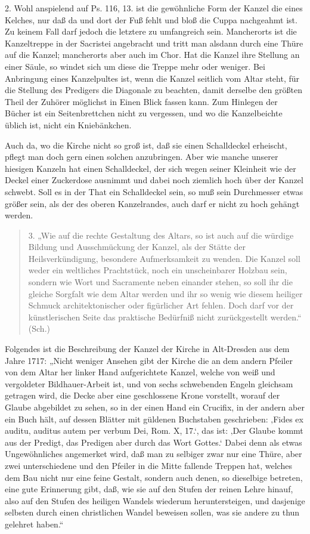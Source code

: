 2. Wohl anspielend auf Ps. 116, 13. ist die gewöhnliche Form der Kanzel die eines Kelches, nur daß da und dort der Fuß fehlt und bloß die Cuppa nachgeahmt ist. Zu keinem Fall darf jedoch die letztere zu umfangreich sein. Mancherorts ist die Kanzeltreppe in der Sacristei angebracht und tritt man alsdann durch eine Thüre auf die Kanzel; mancherorts aber auch im Chor. Hat die Kanzel ihre Stellung an einer Säule, so windet sich um diese die Treppe mehr oder weniger. Bei Anbringung eines Kanzelpultes ist, wenn die Kanzel seitlich vom Altar steht, für die Stellung des Predigers die Diagonale zu beachten, damit derselbe den größten Theil der Zuhörer möglichst in Einen Blick fassen kann. Zum Hinlegen der Bücher ist ein Seitenbrettchen nicht zu vergessen, und wo die Kanzelbeichte üblich ist, nicht ein Kniebänkchen.

Auch da, wo die Kirche nicht so groß ist, daß sie einen Schalldeckel erheischt, pflegt man doch gern einen solchen anzubringen. Aber wie manche unserer hiesigen Kanzeln hat einen Schalldeckel, der sich wegen seiner Kleinheit wie der Deckel einer Zuckerdose ausnimmt und dabei noch ziemlich hoch über der Kanzel schwebt. Soll es in der That ein Schalldeckel sein, so muß sein Durchmesser etwas größer sein, als der des oberen Kanzelrandes, auch darf er nicht zu hoch gehängt werden.

\begin{quote}
3. „Wie auf die rechte Gestaltung des Altars, so ist auch auf die würdige Bildung und Ausschmückung der Kanzel, als der Stätte der Heilsverkündigung,
besondere Aufmerksamkeit zu wenden. Die Kanzel soll weder ein weltliches Prachtstück, noch ein unscheinbarer Holzbau sein, sondern wie Wort und Sacramente neben einander stehen, so soll ihr die gleiche Sorgfalt wie dem Altar werden und ihr so wenig wie diesem heiliger Schmuck architektonischer oder figürlicher Art fehlen. Doch darf vor der künstlerischen Seite das praktische Bedürfniß nicht zurückgestellt werden.“ (Sch.)
\end{quote}

Folgendes ist die Beschreibung der Kanzel der Kirche in Alt-Dresden aus dem Jahre 1717: „Nicht weniger Ansehen gibt der Kirche die an dem andern Pfeiler von dem Altar her linker Hand aufgerichtete Kanzel, welche von weiß und vergoldeter Bildhauer-Arbeit ist, und von sechs schwebenden Engeln gleichsam getragen wird, die Decke aber eine geschlossene Krone vorstellt, worauf der Glaube abgebildet zu sehen, so in der einen Hand ein Crucifix, in der andern aber ein Buch hält, auf dessen Blätter mit güldenen Buchstaben geschrieben: ‚Fides ex auditu, auditus autem per verbum Dei, Rom. X, 17.‘, das ist: ‚Der Glaube kommt aus der Predigt, das Predigen aber durch das Wort Gottes.‘ Dabei denn als etwas Ungewöhnliches angemerket wird, daß man zu selbiger zwar nur eine Thüre, aber zwei unterschiedene und den Pfeiler in die Mitte fallende Treppen hat, welches dem Bau nicht nur eine feine Gestalt, sondern auch denen, so dieselbige betreten, eine gute Erinnerung gibt, daß, wie sie auf den Stufen der reinen Lehre hinauf, also auf den Stufen des heiligen Wandels wiederum heruntersteigen, und dasjenige selbsten durch einen christlichen Wandel beweisen sollen, was sie andere zu thun gelehret haben.“

